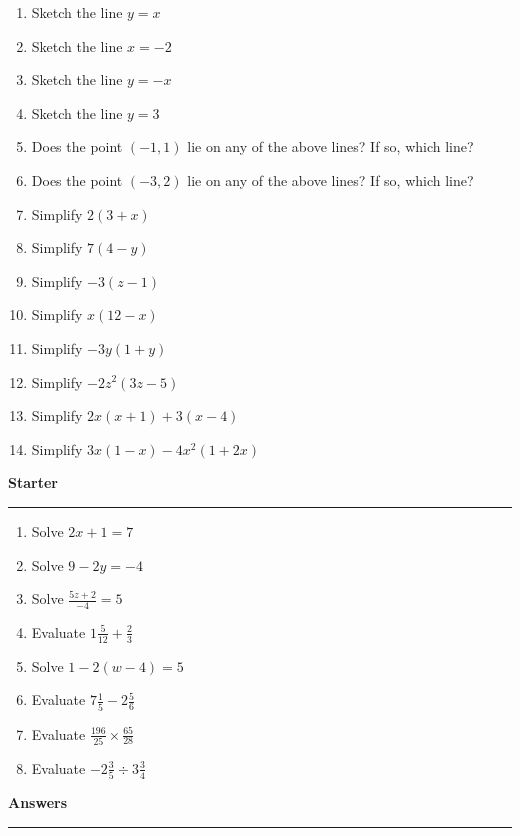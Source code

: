 \documentclass[12pt]{article}
\begin{document}
\begin{enumerate}
    \item Sketch the line \(y=x\)
    \item Sketch the line \(x=-2\)
    \item Sketch the line \(y=-x\)
    \item Sketch the line \(y=3\)
    \item Does the point \((-1,1)\) lie on any of the above lines? If so, which line?
    \item Does the point \((-3,2)\) lie on any of the above lines? If so, which line?
    \item Simplify \(2(3+x)\)
    \item Simplify \(7(4-y)\)
    \item Simplify \(-3(z-1)\)
    \item Simplify \( x(12-x)\)
    \item Simplify \( -3y(1+y)\)
    \item Simplify \(-2z^2(3z-5)\)
    \item Simplify \(2x(x+1)+3(x-4)\)
    \item Simplify \( 3x(1-x) - 4x^2(1+2x) \)
    
\end{enumerate}

\newpage

\noindent \textbf{Starter}

\medskip

\hrule

\medskip

\begin{enumerate}
    \item Solve \(2x+1=7\)
    \item Solve \(9-2y=-4\)
    \item Solve \(\frac{5z+2}{-4}=5\)
    \item Evaluate \(1\frac{5}{12}+\frac{2}{3}\)
    \item Solve \(1-2(w-4)=5\)
    \item Evaluate \(7\frac{1}{5}-2\frac{5}{6}\)
    \item Evaluate \(\frac{196}{25} \times \frac{65}{28}\)
    \item Evaluate \(-2\frac{3}{5}\div 3\frac{3}{4}\)
\end{enumerate}

\newpage

\noindent \textbf{Answers}

\medskip

\hrule 
\end{document}
